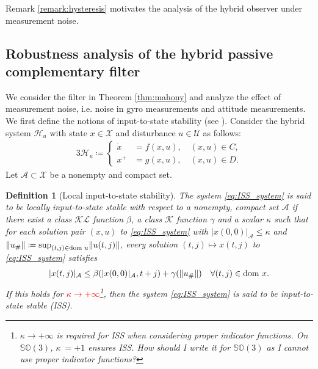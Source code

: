 \documentclass{article}
\DeclarePairedDelimiter{\norm}{\lVert}{\rVert}
\newcommand{\dom}{\text{dom }}
\newcommand{\SOthree}{\mathbb{SO}(3)}
\newtheorem{definition}{Definition}
\begin{document}
\begin{flushleft}
Remark \ref{remark:hysteresis} motivates the analysis of the hybrid observer under measurement noise. 
\end{flushleft}

\subsection{Robustness analysis of the hybrid passive complementary filter}
We consider the filter in Theorem \ref{thm:mahony} and analyze the effect of measurement noise, i.e. noise in gyro measurements and attitude measurements. We first define the notions of input-to-state stability (see \cite{Cai_and_Teel, Khalil}).  Consider the hybrid system $\mathcal{H}_u$ with state $x\in\mathcal{X}$ and disturbance $u\in\mathcal{U}$ as follows:
\begin{alignat}{3}\label{eq:ISS_system}
    \mathcal{H}_u\coloneqq \begin{cases}
        \dot{x} &= f(x,u), \quad (x,u)\in C,\\
        x^+ &= g(x,u), \quad (x,u)\in D.
    \end{cases}
\end{alignat}
Let $\mathcal{A}\subset\mathcal{X}$ be a nonempty and compact set. 

\begin{definition}[{Local input-to-state stability}]
    The system  \eqref{eq:ISS_system} is said to be locally input-to-state stable with respect to a nonempty, compact set $\mathcal{A}$ if there exist a class $\mathcal{KL}$ function $\beta$, a class $\mathcal{K}$ function $\gamma$ and a scalar $\kappa$ such that for each solution pair $(x,u)$ to \eqref{eq:ISS_system} with $|{x(0,0)}|_\mathcal{A}\leq \kappa$ and  $\norm{u_{\#}}\coloneqq  \sup_{(t,j)\in \dom u} \norm{u(t,j)}$, every solution $(t,j)\mapsto x(t,j)$ to \eqref{eq:ISS_system} satisfies
    \begin{align*}
        |x(t,j)|_\mathcal{A}\leq \beta(|x(0,0)|_\mathcal{A}, t+j) + \gamma(\norm{u_{\#}}) \quad \forall (t,j)\in \dom x.
    \end{align*}
    If this holds for \textcolor{red}{$\kappa \to +\infty$}\footnote{$\kappa\to+\infty$ is required for ISS when considering proper indicator functions. On $\SOthree$, $\kappa\ = +1$ ensures ISS. How should I write it for $\SOthree$ as I cannot use proper indicator functions?}, then the system \eqref{eq:ISS_system} is said to be input-to-state stable (ISS). 
\end{definition}
\end{document}
